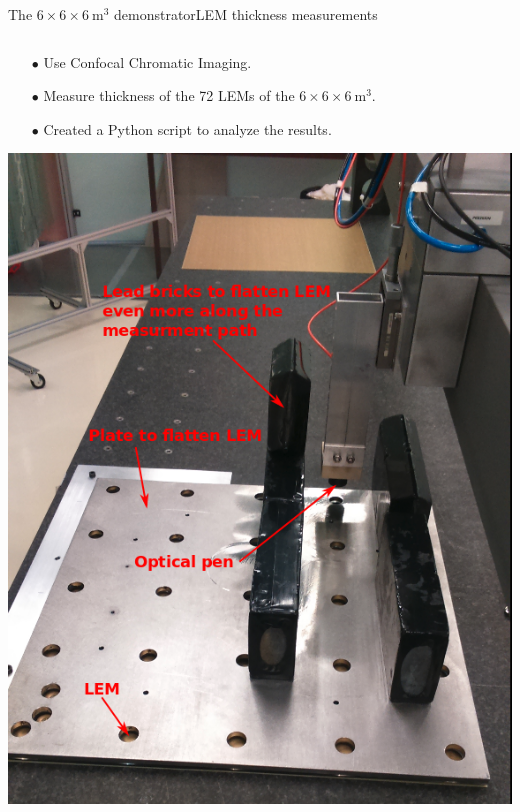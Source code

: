 \documentclass[10pt]{beamer}
\begin{document}
\begin{frame}{The \texorpdfstring{$6 \times 6 \times \SI{6}{\meter\cubed}$}{666} demonstrator}{LEM thickness measurements}
\begin{scriptsize}
\begin{columns}
    			\hfill
    			\begin{column}{0.5\textwidth}
    				\begin{itemize}
    					\item[$\bullet$] Use Confocal Chromatic Imaging.
    					\item[$\bullet$] Measure thickness of the 72 LEMs of the $6 \times 6 \times \SI{6}{\meter\cubed}$.
    					\item[$\bullet$] Created a Python script to analyze the results.
    				\end{itemize}
    				\centering \includegraphics[height=0.5\textheight]{figures/666/plate_and_bricks.png}
    			\end{column}
    		\end{columns}
    	\end{scriptsize}
    \end{frame}
    
\end{document}
